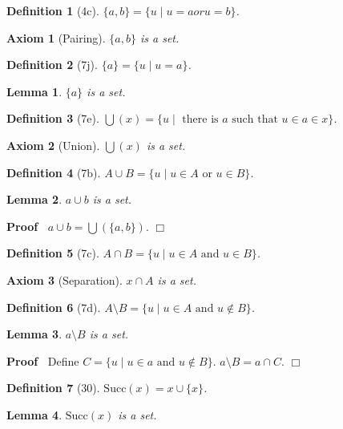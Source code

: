 \documentclass{article}
\newenvironment{forthel}{\begin{leftbar}}{\end{leftbar}}
\newenvironment{proof}{\noindent\textbf{Proof\ }}{\hspace*{\fill}$\Box$\medskip}
\newtheorem{axiom}{Axiom}
\newtheorem{lemma}{Lemma}
\newtheorem{definition}{Definition}
\begin{document}
\begin{forthel}
\begin{definition}[4c] $\{a,b\} = \{u \mid u = a or u = b\}$.
\end{definition}

\begin{axiom}[Pairing] $\{a,b\}$ is a set.
\end{axiom}

\begin{definition}[7j] $\{a\} = \{u \mid u = a\}$.
\end{definition}

\begin{lemma} $\{a\}$ is a set. \end{lemma}

\begin{definition}[7e] 
$\bigcup(x) = \{u \mid \text{ there is } a \text{ such that }u \in a \in x\}$.
\end{definition}

\begin{axiom}[Union] $\bigcup(x)$ is a set. \end{axiom}

\begin{definition}[7b] $A \cup B = 
\{u \mid u \in A \text{ or }u \in B\}$.
\end{definition}

\begin{lemma} $a \cup b$ is a set. \end{lemma}
\begin{proof} $a \cup b = \bigcup(\{a,b\})$.
\end{proof}

\begin{definition}[7c] $A \cap B = 
\{u \mid u \in A \text{ and } u \in B\}$.
\end{definition}

\begin{axiom}[Separation] $x \cap A$ is a set.
\end{axiom}

\begin{definition}[7d] $A \setminus B = 
\{u \mid u \in A \text{ and } u \notin B\}$.
\end{definition}

\begin{lemma} $a \setminus B$ is a set. \end{lemma}
\begin{proof} Define 
$C = \{ u \mid u \in a \text{ and } u \notin B\}$.
$a \setminus B = a \cap C$.
\end{proof}

\begin{definition}[30] $\mathrm{Succ}(x) = x \cup \{x\}$.
\end{definition}

\begin{lemma} $\mathrm{Succ}(x)$ is a set.
\end{lemma}
\end{forthel}
\end{document}
